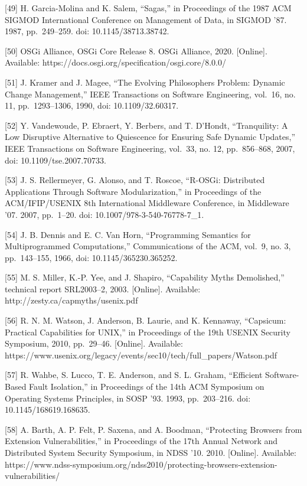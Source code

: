 {[}49{]} H. Garcia-Molina and K. Salem, ``Sagas,'' in Proceedings of the 1987 ACM
SIGMOD International Conference on Management of Data, in SIGMOD '87. 1987,
pp.~249--259. doi: 10.1145/38713.38742.

{[}50{]} OSGi Alliance, OSGi Core Release 8. OSGi Alliance, 2020. {[}Online{]}.
Available: https://docs.osgi.org/specification/osgi.core/8.0.0/

{[}51{]} J. Kramer and J. Magee, ``The Evolving Philosophers Problem: Dynamic
Change Management,'' IEEE Transactions on Software Engineering, vol.~16, no. 11,
pp.~1293--1306, 1990, doi: 10.1109/32.60317.

{[}52{]} Y. Vandewoude, P. Ebraert, Y. Berbers, and T. D'Hondt, ``Tranquility: A Low
Disruptive Alternative to Quiescence for Ensuring Safe Dynamic Updates,'' IEEE
Transactions on Software Engineering, vol.~33, no. 12, pp.~856--868, 2007, doi:
10.1109/tse.2007.70733.

{[}53{]} J. S. Rellermeyer, G. Alonso, and T. Roscoe, ``R-OSGi: Distributed
Applications Through Software Modularization,'' in Proceedings of the ACM/IFIP/USENIX
8th International Middleware Conference, in Middleware '07. 2007, pp.~1--20. doi:
10.1007/978-3-540-76778-7\_1.

{[}54{]} J. B. Dennis and E. C. Van Horn, ``Programming Semantics for
Multiprogrammed Computations,'' Communications of the ACM, vol.~9, no. 3,
pp.~143--155, 1966, doi: 10.1145/365230.365252.

{[}55{]} M. S. Miller, K.-P. Yee, and J. Shapiro, ``Capability Myths Demolished,''
technical report SRL2003--2, 2003. {[}Online{]}. Available:
http://zesty.ca/capmyths/usenix.pdf

{[}56{]} R. N. M. Watson, J. Anderson, B. Laurie, and K. Kennaway, ``Capsicum:
Practical Capabilities for UNIX,'' in Proceedings of the 19th USENIX Security
Symposium, 2010, pp.~29--46. {[}Online{]}. Available:
https://www.usenix.org/legacy/events/sec10/tech/full\_papers/Watson.pdf

{[}57{]} R. Wahbe, S. Lucco, T. E. Anderson, and S. L. Graham, ``Efficient
Software-Based Fault Isolation,'' in Proceedings of the 14th ACM Symposium on
Operating Systems Principles, in SOSP '93. 1993, pp.~203--216. doi: 10.1145/168619.168635.

{[}58{]} A. Barth, A. P. Felt, P. Saxena, and A. Boodman, ``Protecting Browsers from
Extension Vulnerabilities,'' in Proceedings of the 17th Annual Network and
Distributed System Security Symposium, in NDSS '10. 2010. {[}Online{]}. Available:
https://www.ndss-symposium.org/ndss2010/protecting-browsers-extension-vulnerabilities/

